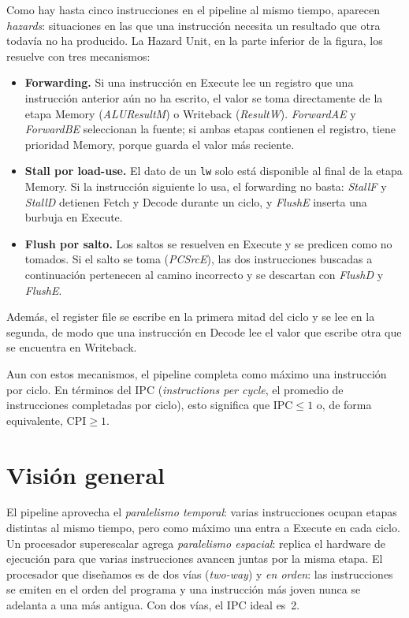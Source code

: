 \documentclass[11pt,a4paper]{article}
\newcommand{\sig}[1]{\textit{#1}}
\newcommand{\ins}[1]{\texttt{#1}}
\begin{document}
Como hay hasta cinco instrucciones en el pipeline al mismo tiempo, aparecen
\emph{hazards}: situaciones en las que una instrucción necesita un resultado que otra
todavía no ha producido. La Hazard Unit, en la parte inferior de la figura, los resuelve
con tres mecanismos:
\begin{itemize}
  \item \textbf{Forwarding.} Si una instrucción en Execute lee un registro que una
        instrucción anterior aún no ha escrito, el valor se toma directamente de la etapa
        Memory (\sig{ALUResultM}) o Writeback (\sig{ResultW}). \sig{ForwardAE} y
        \sig{ForwardBE} seleccionan la fuente; si ambas etapas contienen el registro, tiene
        prioridad Memory, porque guarda el valor más reciente.
  \item \textbf{Stall por load-use.} El dato de un \ins{lw} solo está disponible al final
        de la etapa Memory. Si la instrucción siguiente lo usa, el forwarding no basta:
        \sig{StallF} y \sig{StallD} detienen Fetch y Decode durante un ciclo, y
        \sig{FlushE} inserta una burbuja en Execute.
  \item \textbf{Flush por salto.} Los saltos se resuelven en Execute y se predicen como
        no tomados. Si el salto se toma (\sig{PCSrcE}), las dos instrucciones buscadas a
        continuación pertenecen al camino incorrecto y se descartan con \sig{FlushD} y
        \sig{FlushE}.
\end{itemize}
Además, el register file se escribe en la primera mitad del ciclo y se lee en la segunda,
de modo que una instrucción en Decode lee el valor que escribe otra que se encuentra en
Writeback.

Aun con estos mecanismos, el pipeline completa como máximo una instrucción por ciclo. En
términos del IPC (\emph{instructions per cycle}, el promedio de instrucciones completadas
por ciclo), esto significa que $\text{IPC} \le 1$ o, de forma equivalente,
$\text{CPI} \ge 1$.

\section{Visión general}
\label{sec:overview}

El pipeline aprovecha el \emph{paralelismo temporal}: varias instrucciones ocupan etapas
distintas al mismo tiempo, pero como máximo una entra a Execute en cada ciclo. Un
procesador superescalar agrega \emph{paralelismo espacial}: replica el hardware de
ejecución para que varias instrucciones avancen juntas por la misma etapa. El procesador
que diseñamos es de dos vías (\emph{two-way}) y \emph{en orden}: las instrucciones se
emiten en el orden del programa y una instrucción más joven nunca se adelanta a una más
antigua. Con dos vías, el IPC ideal es~2.
\end{document}
